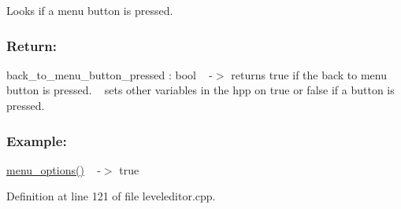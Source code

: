 Looks if a menu button is pressed. 

\subsubsection*{Return\+: }

back\+\_\+to\+\_\+menu\+\_\+button\+\_\+pressed \+: bool ~\newline
-\/$>$ returns true if the back to menu button is pressed. ~\newline
sets other variables in the hpp on true or false if a button is pressed. ~\newline
 \subsubsection*{Example\+: }

\hyperlink{classleveleditor_aa44f48b9869b3d5e0ce0429c6916e2b9}{menu\+\_\+options()} ~\newline
-\/$>$ true ~\newline


Definition at line 121 of file leveleditor.\+cpp.


